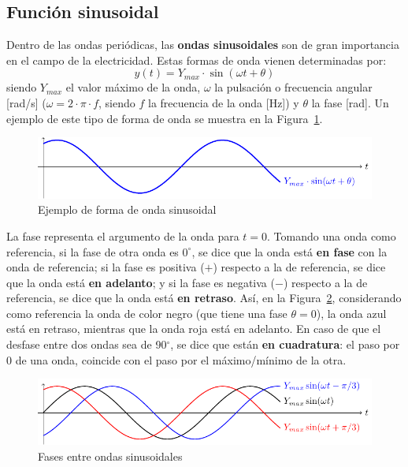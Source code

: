 	\subsection{Función sinusoidal}\label{sec.sinusoidal}
	Dentro de las ondas periódicas, las \textbf{ondas sinusoidales} son de gran importancia en el campo de la electricidad. Estas formas de onda vienen determinadas por:
	\begin{equation}\label{eq.y_senoidal}
		\boxed{y(t)=Y_{max}\cdot\sin(\omega t+\theta)} 
	\end{equation}
	siendo $Y_{max}$ el valor máximo de la onda, $\omega$ la pulsación o frecuencia angular [rad/s] ($\omega=2\cdot\pi\cdot f$, siendo $f$ la frecuencia de la onda [Hz]) y $\theta$ la fase [rad]. Un ejemplo de este tipo de forma de onda se muestra en la Figura~\ref{fig.sin}.
	\begin{figure}[H]
		\centering
		\includegraphics[width=.9\linewidth]{../figs/sin.pdf}
		\caption{Ejemplo de forma de onda sinusoidal}
		\label{fig.sin}
	\end{figure}
	
	La fase representa el argumento de la onda para $t=0$. Tomando una onda como referencia, si la fase de otra onda es $0^\circ$, se dice que la onda está \textbf{en fase} con la onda de referencia; si la fase es positiva ($+$) respecto a la de referencia, se dice que la onda está \textbf{en adelanto}; y si la fase es negativa ($-$) respecto a la de referencia, se dice que la onda está \textbf{en retraso}. Así, en la Figura~\ref{fig.desfase}, considerando como referencia la onda de color negro (que tiene una fase $\theta=0$), la {\color{blue} onda azul} está en retraso, mientras que la {\color{red} onda roja} está en adelanto. En caso de que el desfase entre dos ondas sea de 90$^\circ$, se dice que están \textbf{en cuadratura}: el paso por 0 de una onda, coincide con el paso por el máximo/mínimo de la otra.
	\begin{figure}[H]
		\centering
		\includegraphics[width=.9\linewidth]{../figs/desfase.pdf}
		\caption{Fases entre ondas sinusoidales}
		\label{fig.desfase}
	\end{figure}
	

